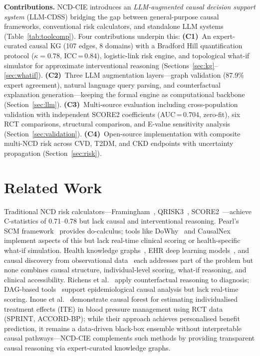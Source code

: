\documentclass[runningheads]{llncs}
\begin{document}
\noindent\textbf{Contributions.}
NCD-CIE introduces an \emph{LLM-augmented causal decision support
system} (LLM-CDSS) bridging the gap between general-purpose causal
frameworks, conventional risk calculators, and standalone LLM systems
(Table~\ref{tab:toolcomp}).
Four contributions underpin this:
\textbf{(C1)}~An expert-curated causal KG (107 edges, 8 domains)
with a Bradford Hill quantification protocol ($\kappa=0.78$,
ICC\,=\,0.84), logistic-link risk engine, and topological what-if
simulator for approximate interventional reasoning
(Sections~\ref{sec:kg}--\ref{sec:whatif}).
\textbf{(C2)}~Three LLM augmentation layers---graph validation
(87.9\% expert agreement), natural language query parsing, and
counterfactual explanation generation---keeping the formal engine
as computational backbone (Section~\ref{sec:llm}).
\textbf{(C3)}~Multi-source evaluation including cross-population
validation with independent SCORE2 coefficients
(AUC\,=\,0.704, zero-fit), six RCT comparisons,
structural comparison, and E-value sensitivity analysis
(Section~\ref{sec:validation}).
\textbf{(C4)}~Open-source implementation with composite multi-NCD
risk across CVD, T2DM, and CKD endpoints with uncertainty
propagation (Section~\ref{sec:risk}).

\section{Related Work}\label{sec:related}

Traditional NCD risk calculators---Framingham~\cite{dagostino2008},
QRISK3~\cite{hippisley2017qrisk3}, SCORE2~\cite{score22021}---achieve
C-statistics of 0.71--0.78 but lack causal and interventional reasoning.
Pearl's SCM framework~\cite{pearl2009causality,hernan2020causal}
provides do-calculus; tools like DoWhy~\cite{sharma2020dowhy} and
CausalNex~\cite{beaumont2021causalnex} implement aspects of this but
lack real-time clinical scoring or health-specific what-if simulation.
Health knowledge graphs~\cite{chandak2023primekg,barabasi2011network},
EHR deep learning models~\cite{li2020behrt,rasmy2021medbert}, and
causal discovery from observational data~\cite{prosperi2020causal}
each addresses part of the problem but none combines causal structure,
individual-level scoring, what-if reasoning, and clinical
accessibility.
Richens et al.~\cite{richens2020causal} apply counterfactual
reasoning to diagnosis; DAG-based tools~\cite{textor2016dagitty}
support epidemiological causal analysis but lack real-time scoring.
Inoue et al.~\cite{inoue2023causalforest} demonstrate causal forest
for estimating individualised treatment effects (ITE) in blood pressure
management using RCT data (SPRINT, ACCORD-BP); while their approach
achieves personalised benefit prediction, it remains a data-driven
black-box ensemble without interpretable causal pathways---NCD-CIE
complements such methods by providing transparent causal reasoning
via expert-curated knowledge graphs.
\end{document}
